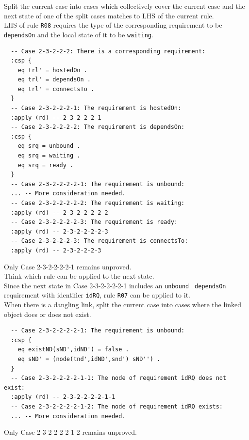\documentclass[12pt]{report}
\begin{document}
 Split the current case into cases which
collectively cover the current case and the next state of one of the split cases
matches to LHS of the current rule. \\
LHS of rule {\tt R08} requires the type of the corresponding requirement
to be {\tt dependsOn} and the local state of it to be {\tt waiting}.
\small
\begin{verbatim}
  -- Case 2-3-2-2-2: There is a corresponding requirement:
  :csp {
    eq trl' = hostedOn .
    eq trl' = dependsOn .
    eq trl' = connectsTo .
  }
  -- Case 2-3-2-2-2-1: The requirement is hostedOn:
  :apply (rd) -- 2-3-2-2-2-1
  -- Case 2-3-2-2-2-2: The requirement is dependsOn:
  :csp {
    eq srq = unbound .
    eq srq = waiting .
    eq srq = ready .
  }
  -- Case 2-3-2-2-2-2-1: The requirement is unbound:
  ... -- More consideration needed.
  -- Case 2-3-2-2-2-2-2: The requirement is waiting:
  :apply (rd) -- 2-3-2-2-2-2-2
  -- Case 2-3-2-2-2-2-3: The requirement is ready:
  :apply (rd) -- 2-3-2-2-2-2-3
  -- Case 2-3-2-2-2-3: The requirement is connectsTo:
  :apply (rd) -- 2-3-2-2-2-3
\end{verbatim}
\normalsize
Only Case 2-3-2-2-2-2-1 remains unproved.\\

 Think which rule can be applied to the next
state. \\
Since the next state in Case 2-3-2-2-2-2-1 includes an {\tt unbound} {\tt
  dependsOn} requirement with identifier {\tt idRQ}, rule {\tt R07} can
be applied to it.\\

 When there is a dangling link, split the
current case into cases where the linked object does or does not
exist.
\small
\begin{verbatim}
  -- Case 2-3-2-2-2-2-1: The requirement is unbound:
  :csp {
    eq existND(sND',idND') = false .
    eq sND' = (node(tnd',idND',snd') sND'') .
  }
  -- Case 2-3-2-2-2-2-1-1: The node of requirement idRQ does not exist:
  :apply (rd) -- 2-3-2-2-2-2-1-1
  -- Case 2-3-2-2-2-2-1-2: The node of requirement idRQ exists:
  ... -- More consideration needed.
\end{verbatim}
\normalsize
Only Case 2-3-2-2-2-2-1-2 remains unproved.\\
\end{document}
